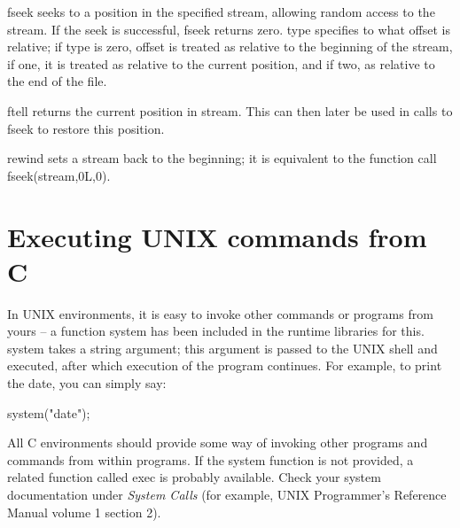      {\cd fseek} seeks to a position in the specified stream,
allowing random access to the  stream. If  the seek  is successful,
{\cd fseek}  returns  zero.    {\cd type} specifies to what {\cd
offset} is  relative;  if {\cd type} is zero,  {\cd offset} is
treated as  relative to  the beginning of the stream, if one, it is
treated as relative to the current position, and if two, as relative
to the end of the file.

     {\cd ftell} returns  the current  position in  {\cd stream}.
This can then later be used in calls to {\cd fseek} to restore this
position.

     {\cd rewind} sets  a  stream  back  to  the  beginning;  it  is
equivalent  to the function call {\cd fseek(stream,0L,0)}.



\section{Executing UNIX commands from C}

     In UNIX  environments, it  is easy  to invoke  other commands or
programs from yours  -- a function 
{\cd system} 
has been included in
the runtime libraries for this. {\cd system}  takes a  string
argument;  this argument  is passed  to the UNIX shell and  executed,
after  which execution  of  the  program  continues.  For example, to
print the date, you can simply say:
\begin{code}
system("date");
\end{code}
\noindent
     All C environments should provide some way of invoking other
programs and commands from  within programs.  If the {\cd system}
function is not provided, a related  function called  {\cd exec} is
probably  available. Check your system documentation under  {\em
System Calls\/}  (for example,  UNIX Programmer's Reference Manual
volume 1 section 2).

